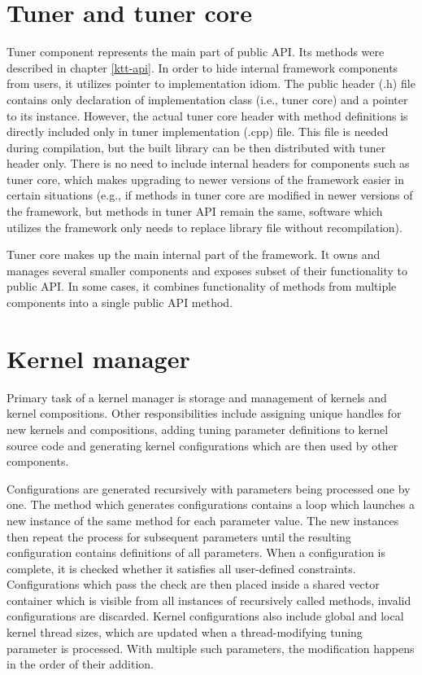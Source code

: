 \documentclass
[
    digital, %
    oneside, %
    table, %
    nolof, %
    nolot, %
    nocover %
]{fithesis3}
\begin{document}
\section{Tuner and tuner core}
Tuner component represents the main part of public API. Its methods were described in chapter \ref{ktt-api}. In order to hide internal framework
components from users, it utilizes pointer to implementation idiom. The public header (.h) file contains only declaration of implementation class
(i.e., tuner core) and a pointer to its instance. However, the actual tuner core header with method definitions is directly included only in tuner
implementation (.cpp) file. This file is needed during compilation, but the built library can be then distributed with tuner header only. There is
no need to include internal headers for components such as tuner core, which makes upgrading to newer versions of the framework easier in certain situations
(e.g., if methods in tuner core are modified in newer versions of the framework, but methods in tuner API remain the same, software which utilizes the
framework only needs to replace library file without recompilation).

Tuner core makes up the main internal part of the framework. It owns and manages several smaller components and exposes subset of their functionality
to public API. In some cases, it combines functionality of methods from multiple components into a single public API method.

\section{Kernel manager}
Primary task of a kernel manager is storage and management of kernels and kernel compositions. Other responsibilities include assigning unique handles for
new kernels and compositions, adding tuning parameter definitions to kernel source code and generating kernel configurations which are then used by other
components.

Configurations are generated recursively with parameters being processed one by one. The method which generates configurations contains a loop which
launches a new instance of the same method for each parameter value. The new instances then repeat the process for subsequent parameters until the
resulting configuration contains definitions of all parameters. When a configuration is complete, it is checked whether it satisfies all user-defined
constraints. Configurations which pass the check are then placed inside a shared vector container which is visible from all instances of recursively
called methods, invalid configurations are discarded. Kernel configurations also include global and local kernel thread sizes, which are updated when
a thread-modifying tuning parameter is processed. With multiple such parameters, the modification happens in the order of their addition.
\end{document}

